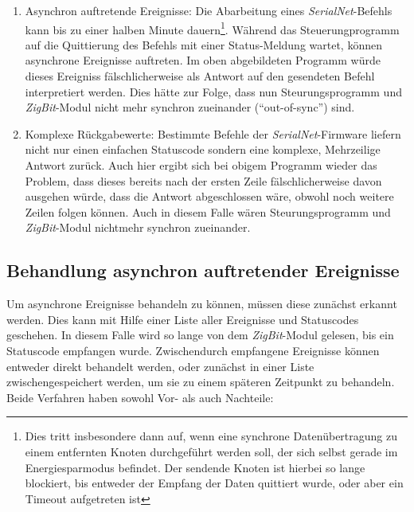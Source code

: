             \begin{enumerate}
                \item{Asynchron auftretende Ereignisse:} Die Abarbeitung eines \emph{SerialNet}-Befehls kann 
                          bis zu einer halben Minute dauern\footnote{Dies tritt insbesondere dann auf, wenn eine
                          synchrone Datenübertragung zu einem entfernten Knoten durchgeführt werden soll, der sich
                          selbst gerade im Energiesparmodus befindet. Der sendende Knoten ist hierbei so lange
                          blockiert, bis entweder der Empfang der Daten quittiert wurde, oder aber ein 
                          Timeout aufgetreten ist}. Während das Steuerungprogramm auf die Quittierung des 
                          Befehls mit einer Status-Meldung wartet, können asynchrone Ereignisse auftreten.
                          Im oben abgebildeten Programm würde dieses Ereigniss fälschlicherweise als Antwort
                          auf den gesendeten Befehl interpretiert werden. Dies hätte zur Folge, dass nun 
                          Steurungsprogramm und \emph{ZigBit}-Modul nicht mehr synchron zueinander ("`out-of-sync"') 
                          sind.

                \item{Komplexe Rückgabewerte:} Bestimmte Befehle der \emph{SerialNet}-Firmware liefern nicht nur
                         einen einfachen Statuscode sondern eine komplexe, Mehrzeilige Antwort zurück. Auch hier ergibt
                         sich bei obigem Programm wieder das Problem, dass dieses bereits nach der ersten Zeile
                         fälschlicherweise davon ausgehen würde, dass die Antwort abgeschlossen wäre, obwohl noch weitere
                         Zeilen folgen können. Auch in diesem Falle wären Steurungsprogramm und \emph{ZigBit}-Modul nichtmehr
                         synchron zueinander.
            \end{enumerate}

        \subsection{Behandlung asynchron auftretender Ereignisse}
            \label{behandlung_asynchron_auftretender_ereignisse}

            Um asynchrone Ereignisse behandeln zu können, müssen diese zunächst erkannt werden. Dies kann mit
            Hilfe einer Liste aller Ereignisse und Statuscodes geschehen. In diesem Falle wird so lange
            von dem \emph{ZigBit}-Modul gelesen, bis ein Statuscode empfangen wurde. Zwischendurch empfangene
            Ereignisse können entweder direkt behandelt werden, oder zunächst in einer Liste zwischengespeichert
            werden, um sie zu einem späteren Zeitpunkt zu behandeln. Beide Verfahren haben sowohl Vor- als auch
            Nachteile:

